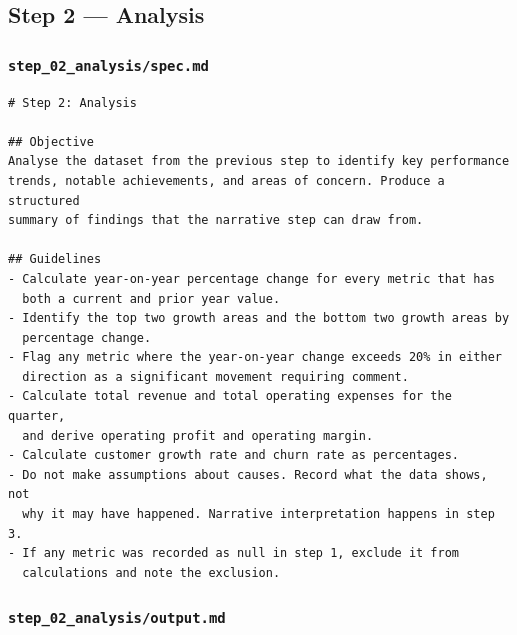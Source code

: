 \documentclass[12pt, a4paper]{article}
\begin{document}
\subsection{Step 2 — Analysis}

\subsubsection{\texttt{step\_02\_analysis/spec.md}}

\begin{lstlisting}[language={}]
# Step 2: Analysis

## Objective
Analyse the dataset from the previous step to identify key performance
trends, notable achievements, and areas of concern. Produce a structured
summary of findings that the narrative step can draw from.

## Guidelines
- Calculate year-on-year percentage change for every metric that has
  both a current and prior year value.
- Identify the top two growth areas and the bottom two growth areas by
  percentage change.
- Flag any metric where the year-on-year change exceeds 20% in either
  direction as a significant movement requiring comment.
- Calculate total revenue and total operating expenses for the quarter,
  and derive operating profit and operating margin.
- Calculate customer growth rate and churn rate as percentages.
- Do not make assumptions about causes. Record what the data shows, not
  why it may have happened. Narrative interpretation happens in step 3.
- If any metric was recorded as null in step 1, exclude it from
  calculations and note the exclusion.
\end{lstlisting}

\subsubsection{\texttt{step\_02\_analysis/output.md}}
\end{document}

